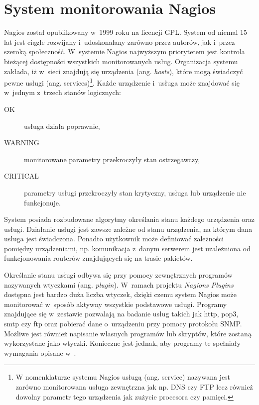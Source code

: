 \section[Nagios][System monitorowania Nagios]{System monitorowania Nagios}

Nagios\cite{www:Nagios} został opublikowany w~1999 roku na licencji GPL. System od
niemal 15 lat jest ciągle rozwijany i~udoskonalany zarówno przez
autorów, jak i~przez szeroką społeczność. W~systemie Nagios najwyższym
priorytetem jest kontrola bieżącej dostępności wszystkich
monitorowanych usług. Organizacja systemu zakłada, iż w~sieci znajdują
się urządzenia (ang. {\em hosts}), które mogą świadczyć pewne usługi
(ang. services)\footnote{W nomenklaturze systemu Nagios usługą
  (ang. service) nazywana jest zarówno monitorowana usługa zewnętrzna
  jak np. DNS czy FTP lecz również dowolny parametr tego urządzenia
  jak zużycie procesora czy pamięci.}. Każde urządzenie i~usługa może
  znajdować się w~jednym z~trzech stanów logicznych:

\begin{description}
\item[OK] usługa działa poprawnie,
\item[WARNING] monitorowane parametry przekroczyły stan ostrzegawczy,
\item[CRITICAL] parametry usługi przekroczyły stan krytyczny, usługa
  lub urządzenie nie funkcjonuje.
\end{description}

System posiada rozbudowane algorytmy określania stanu każdego
urządzenia oraz usługi. Działanie usługi jest zawsze zależne od stanu
urządzenia, na którym dana usługa jest świadczona. Ponadto użytkownik
może definiować zależności pomiędzy urządzeniami, np. komunikacja
z~danym serwerem jest uzależniona od funkcjonowania routerów
znajdujących się na trasie pakietów.

Określanie stanu usługi odbywa się przy pomocy zewnętrznych programów
nazywanych wtyczkami (ang. {\em plugin}). W~ramach projektu {\em
  Nagions Plugins}\cite{www:NagiosPluginProject} dostępna jest bardzo
duża liczba wtyczek, dzięki czemu system Nagios może monitorować
w~sposób aktywny wszystkie podstawowe usługi. Programy znajdujące się
w~zestawie pozwalają na badanie usług takich jak http, pop3, smtp czy
ftp oraz pobierać dane o~urządzeniu przy pomocy protokołu
SNMP. Możliwe jest również napisanie własnych programów lub skryptów,
które zostaną wykorzystane jako wtyczki. Konieczne jest jednak, aby
programy te spełniały wymagania opisane
w~\cite{www:NagiosPluginsTutorial}.

